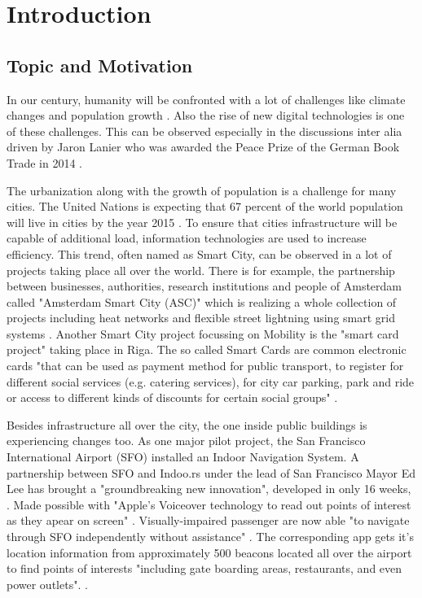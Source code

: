  \newpage
\section{Introduction}  %

\subsection{Topic and Motivation} %
In our century, humanity will be confronted with a lot of challenges like climate changes \parencite{nclimate} and population growth \parencite{unitedNations2012}. Also the rise of new digital technologies is one of these challenges. This can be observed especially in the discussions inter alia driven by Jaron Lanier who was awarded the Peace Prize of the German Book Trade in 2014 \parencite{jaronLanier}. 

The urbanization along with the growth of population is a challenge for many cities. The United Nations is expecting that 67 percent of the world population will live in cities by the year 2015 \parencite{unitedNations2012}. To ensure that cities infrastructure will be capable of additional load, information technologies are used to increase efficiency. This trend, often named as Smart City, can be observed in a lot of projects taking place all over the world. There is for example, the partnership between businesses, authorities, research institutions and people of Amsterdam called "Amsterdam Smart City (ASC)" which is realizing a whole collection of projects including heat networks and flexible street lightning using smart grid systems \parencite{asc:2014}. Another Smart City project focussing on Mobility is the "smart card project" taking place in Riga. The so called Smart Cards are common electronic cards "that can be used as payment method for public transport, to register for different social services (e.g. catering services), for city car parking, park and ride or access to different kinds of discounts for certain social groups" \parencite{stepUpSmartCards}.

Besides infrastructure all over the city, the one inside public buildings is experiencing changes too. As one major pilot project, the San Francisco International Airport (SFO) installed an Indoor Navigation System. A partnership between SFO and Indoo.rs under the lead of San Francisco Mayor Ed Lee has brought a "groundbreaking new innovation", developed in only 16 weeks,  \parencite{flySfo2}. Made possible with "Apple's Voiceover technology to read out points of interest as they apear on screen" \parencite{flySfo2}. Visually-impaired passenger are now able "to navigate through SFO independently without assistance" \parencite{flySfo1}.  The corresponding app gets it's location information from approximately 500 beacons located all over the airport to find points of interests "including gate boarding areas, restaurants, and even power outlets". \parencite{flySfo1}.

